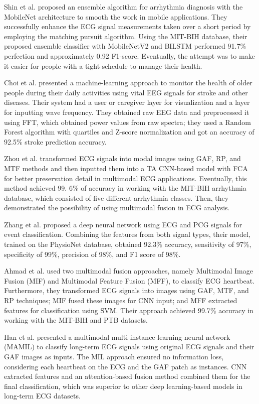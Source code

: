 \documentclass[conference]{IEEEtran}
\begin{document}
Shin et al. \cite{shin2022lightweight} proposed an ensemble algorithm for arrhythmia diagnosis with the MobileNet architecture to smooth the work in mobile applications. They successfully enhance the ECG signal measurements taken over a short period by employing the matching pursuit algorithm. Using the MIT-BIH database, their proposed ensemble classifier with MobileNetV2 and BILSTM performed 91.7\% perfection and approximately 0.92 F1-score. Eventually, the attempt was to make it easier for people with a tight schedule to manage their health.

Choi et al. \cite{choi2021machine} presented a machine-learning approach to monitor the health of older people during their daily activities using vital EEG signals for stroke and other diseases. Their system had a user or caregiver layer for visualization and a layer for inputting wave frequency. They obtained raw EEG data and preprocessed it using FFT, which obtained power values from raw spectra; they used a Random Forest algorithm with quartiles and Z-score normalization and got an accuracy of 92.5\% stroke prediction accuracy.

Zhou et al. \cite{zhou2024multimodal} transformed ECG signals into modal images using GAF, RP, and MTF methods and then inputted them into a TA CNN-based model with FCA for better preservation detail in multimodal ECG applications. Eventually, this method achieved 99. 6\% of accuracy in working with the MIT-BIH arrhythmia database, which consisted of five different arrhythmia classes. Then, they demonstrated the possibility of using multimodal fusion in ECG analysis.

Zhang et al. \cite{zhang2023multimodal} proposed a deep neural network using ECG and PCG signals for event classification. Combining the features from both signal types, their model, trained on the PhysioNet database, obtained 92.3\% accuracy, sensitivity of 97\%, specificity of 99\%, precision of 98\%, and F1 score of 98\%.

Ahmad et al. \cite{ahmad2021ecg} used two multimodal fusion approaches, namely Multimodal Image Fusion (MIF) and Multimodal Feature Fusion (MFF), to classify ECG heartbeat. Furthermore, they transformed  ECG signals into images using GAF, MTF, and RP techniques; MIF fused these images for CNN input; and MFF extracted features for classification using SVM. Their approach achieved 99.7\% accuracy in working with the MIT-BIH and PTB datasets.

Han et al. \cite{han2023multimodal} presented a multimodal multi-instance learning neural network (MAMIL) to classify long-term ECG signals using original ECG signals and their GAF images as inputs. The MIL approach ensured no information loss, considering each heartbeat on the ECG and the GAF patch as instances. CNN extracted features and an attention-based fusion method combined them for the final classification, which was superior to other deep learning-based models in long-term ECG datasets.
\end{document}
